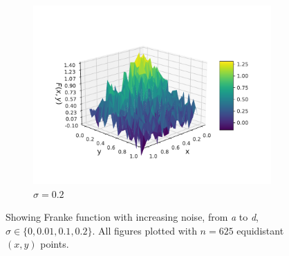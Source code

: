 \documentclass[twocolumn,english,notitlepage]{article}
\begin{document}
\begin{appendices}
\begin{figure}
\begin{subfigure}{.5\textwidth}
                \includegraphics[width=\linewidth]{franke_functions_0_2.pdf}
                \caption{$\sigma = 0.2$}

            \end{subfigure}
        
            \caption{Showing Franke function with increasing noise, from \textit{a} to \textit{d}, $\sigma \in \{ 0, 0.01, 0.1, 0.2\}$. All figures plotted with $n = 625$ equidistant $(x,y)$ points.}\label{fig:app:frankefunction varying noise}
        \end{figure}

    

\end{appendices}
\end{document}
